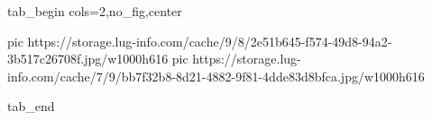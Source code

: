 
 
 
 
 

\ifcmt
  tab_begin cols=2,no_fig,center

     pic https://storage.lug-info.com/cache/9/8/2e51b645-f574-49d8-94a2-3b517c26708f.jpg/w1000h616
		 pic https://storage.lug-info.com/cache/7/9/bb7f32b8-8d21-4882-9f81-4dde83d8bfca.jpg/w1000h616

  tab_end
\fi
